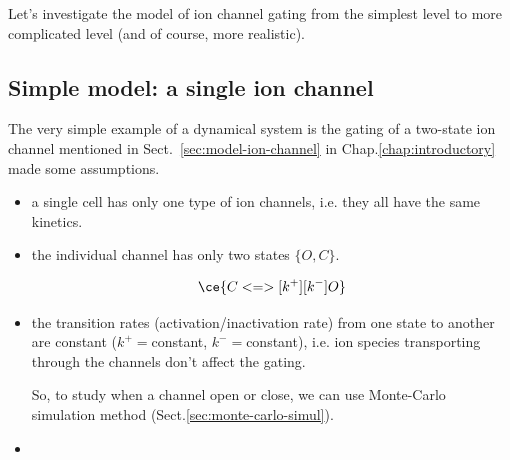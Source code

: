 Let's investigate the model of ion channel gating from the simplest level to
more complicated level (and of course, more realistic).

%
%
%
%

\subsection{Simple model: a single ion channel}

The very simple example of a dynamical system is the gating of a two-state ion
channel mentioned in Sect.~\ref{sec:model-ion-channel} in
Chap.\ref{chap:introductory} made some assumptions.

\begin{itemize}
\item a single cell has only one type of ion channels, i.e. they all have the
same kinetics.

\item the individual channel has only two states $\{O, C \}$.

\begin{equation}
\ce{C <=>[k^+][k^-] O}
\end{equation}

\item the transition rates (activation/inactivation rate) from one state to
another are constant ($k^+ = $constant, $k^-=$constant), i.e.
ion species transporting through the channels don't affect the gating.

So, to study when a channel open or close, we can use Monte-Carlo simulation
method (Sect.\ref{sec:monte-carlo-simul}).

\item
\end{itemize}

